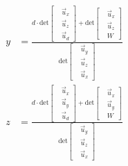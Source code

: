 \begin{align}
    y&=\frac{d\cdot
    \text{det}
	\begin{bmatrix}
	&\vec{u}_x\\
	&\vec{u}_z \\
	&\vec{u}_d
	\end{bmatrix}+\text{det}\begin{bmatrix}
	&\vec{u}_x\\
	&\vec{u}_z \\
	&W
	\end{bmatrix}}{\text{det}\begin{bmatrix}
	&\vec{u}_y\\
	&\vec{u}_z \\
	&\vec{u}_x
	\end{bmatrix}}
\end{align}
\begin{align}
    z&=\frac{d\cdot
    \text{det}
	\begin{bmatrix}
	&\vec{u}_x\\
	&\vec{u}_y \\
	&\vec{u}_d
	\end{bmatrix}+\text{det}\begin{bmatrix}
	&\vec{u}_x\\
	&\vec{u}_y \\
	&W
	\end{bmatrix}}{\text{det}\begin{bmatrix}
	&\vec{u}_y\\
	&\vec{u}_z \\
	&\vec{u}_x
	\end{bmatrix}}
\end{align}

